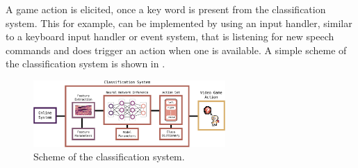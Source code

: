 A game action is elicited, once a key word is present from the classification system.
This for example, can be implemented by using an input handler, similar to a keyboard input handler or event system, that is listening for new speech commands and does trigger an action when one is available.
A simple scheme of the classification system is shown in .
\begin{figure}[!ht]
  \centering
  \includegraphics[width=0.65\textwidth]{./6_game/figs/game_system_classification}
  \caption{Scheme of the classification system.}
  \label{fig:game_system_classification}
\end{figure}
\FloatBarrier
\noindent

